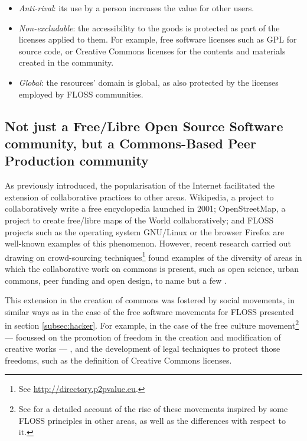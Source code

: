 \begin{itemize}
	\item \textit{Anti-rival}: its use by a person increases the value for other users.
	\item\textit{Non-excludable}: the accessibility to the goods is protected as part of the licenses applied to them. For example, free software licenses such as GPL for source code, or Creative Commons licenses for the contents and materials created in the community. 
	\item \textit{Global}: the resources' domain is global, as also protected by the licenses employed by FLOSS communities.
\end{itemize}

\subsection{Not just a Free/Libre Open Source Software community, but a Commons-Based Peer Production community}
\label{subsubsec:state-art:cbpp:commons:cbpp}

As previously introduced, the popularisation of the Internet facilitated the extension of collaborative practices to other areas. Wikipedia, a project to collaboratively write a free encyclopedia launched in 2001; OpenStreetMap, a project to create free/libre maps of the World collaboratively; and FLOSS projects such as the operating system GNU/Linux or the browser Firefox are well-known examples of this phenomenon. However, recent research carried out drawing on crowd-sourcing techniques\footnote{See \url{http://directory.p2pvalue.eu}.} found examples of the diversity of areas in which the collaborative work on commons is present, such as open science, urban commons, peer funding and open design, to name but a few \parencite{morell2016mayo}.

This extension in the creation of commons was fostered by social movements, in similar ways as in the case of the free software movements for FLOSS presented in section \ref{subsec:hacker}. For example, in the case of the free culture movement\footnote{See \textcite[17-29]{fuster2010governance} for a detailed account of the rise of these movements inspired by some FLOSS principles in other areas, as well as the differences with respect to it.}  --- focussed on the  promotion of freedom in the creation and modification of creative works --- , and the development of legal techniques to protect those freedoms, such as the definition of Creative Commons licenses.

